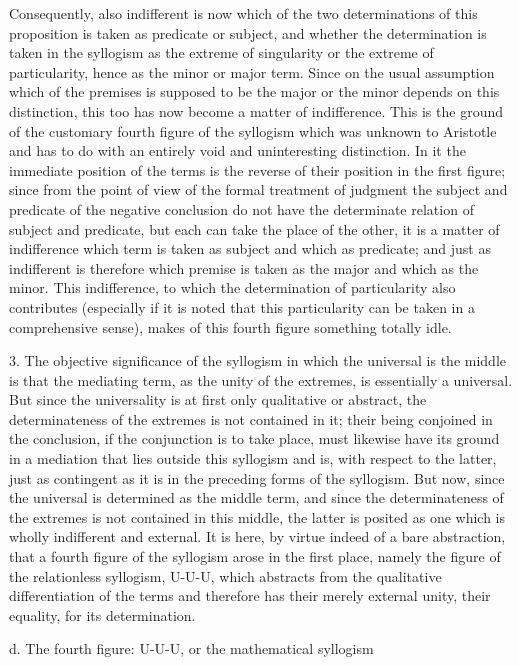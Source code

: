 Consequently, also indifferent is now
which of the two determinations
of this proposition is taken as predicate or subject,
and whether the determination is taken in the syllogism as
the extreme of singularity or the extreme of particularity,
hence as the minor or major term.
Since on the usual assumption
which of the premises is supposed to be
the major or the minor depends on this distinction,
this too has now become a matter of indifference.
This is the ground of the customary
fourth figure of the syllogism
which was unknown to Aristotle
and has to do with an entirely void
and uninteresting distinction.
In it the immediate position of the terms is
the reverse of their position in the first figure;
since from the point of view of the formal treatment of judgment
the subject and predicate of the negative conclusion
do not have the determinate relation of subject and predicate,
but each can take the place of the other,
it is a matter of indifference which term is taken
as subject and which as predicate;
and just as indifferent is therefore
which premise is taken as the major
and which as the minor.
This indifference, to which the determination of particularity
also contributes
(especially if it is noted that this particularity
can be taken in a comprehensive sense),
makes of this fourth figure something totally idle.

3. The objective significance of the syllogism
in which the universal is the middle is that the mediating term,
as the unity of the extremes, is essentially a universal.
But since the universality is at first only qualitative or abstract,
the determinateness of the extremes is not contained in it;
their being conjoined in the conclusion,
if the conjunction is to take place,
must likewise have its ground in a mediation
that lies outside this syllogism
and is, with respect to the latter,
just as contingent as it is in
the preceding forms of the syllogism.
But now, since the universal is determined as the middle term,
and since the determinateness of the extremes
is not contained in this middle,
the latter is posited as one
which is wholly indifferent and external.
It is here, by virtue indeed of a bare abstraction,
that a fourth figure of the syllogism arose in the first place,
namely the figure of the relationless syllogism, U-U-U,
which abstracts from the qualitative differentiation of the terms
and therefore has their merely external unity,
their equality, for its determination.

d. The fourth figure: U-U-U, or the mathematical syllogism

